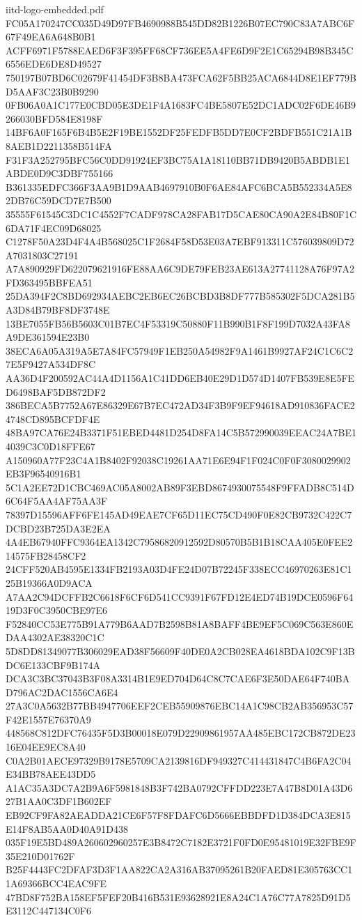 \begin{filecontents*}[overwrite]{iitd-logo-embedded.pdf}
FC05A170247CC035D49D97FB4690988B545DD82B1226B07EC790C83A7ABC6F67F49EA6A648B0B1
ACFF6971F5788EAED6F3F395FF68CF736EE5A4FE6D9F2E1C65294B98B345C6556EDE6DE8D49527
750197B07BD6C02679F41454DF3B8BA473FCA62F5BB25ACA6844D8E1EF779BD5AAF3C23B0B9290
0FB06A0A1C177E0CBD05E3DE1F4A1683FC4BE5807E52DC1ADC02F6DE46B9266030BFD584E8198F
14BF6A0F165F6B4B5E2F19BE1552DF25FEDFB5DD7E0CF2BDFB551C21A1B8AEB1D2211358B514FA
F31F3A252795BFC56C0DD91924EF3BC75A1A18110BB71DB9420B5ABDB1E1ABDE0D9C3DBF755166
B361335EDFC366F3AA9B1D9AAB4697910B0F6AE84AFC6BCA5B552334A5E82DB76C59DCD7E7B500
35555F61545C3DC1C4552F7CADF978CA28FAB17D5CAE80CA90A2E84B80F1C6DA71F4EC09D68025
C1278F50A23D4F4A4B568025C1F2684F58D53E03A7EBF913311C576039809D72A7031803C27191
A7A890929FD622079621916FE88AA6C9DE79FEB23AE613A27741128A76F97A2FD363495BBFEA51
25DA394F2C8BD692934AEBC2EB6EC26BCBD3B8DF777B585302F5DCA281B5A3D84B79BF8DF3748E
13BE7055FB56B5603C01B7EC4F53319C50880F11B990B1F8F199D7032A43FA8A9DE361594E23B0
38ECA6A05A319A5E7A84FC57949F1EB250A54982F9A1461B9927AF24C1C6C27E5F9427A534DF8C
AA36D4F200592AC44A4D1156A1C41DD6EB40E29D1D574D1407FB539E8E5FED6498BAF5DB872DF2
386BECA5B7752A67E86329E67B7EC472AD34F3B9F9EF94618AD910836FACE24748CD895BCFDF4E
48BA97CA76E24B3371F51EBED4481D254D8FA14C5B572990039EEAC24A7BE14039C3C0D18FFE67
A150960A77F23C4A1B8402F92038C19261AA71E6E94F1F024C0F0F3080029902EB3F96540916B1
5C1A2EE72D1CBC469AC05A8002AB89F3EBD8674930075548F9FFADB8C514D6C64F5AA4AF75AA3F
78397D15596AFF6FE145AD49EAE7CF65D11EC75CD490F0E82CB9732C422C7DCBD23B725DA3E2EA
4A4EB67940FFC9364EA1342C79586820912592D80570B5B1B18CAA405E0FEE214575FB28458CF2
24CFF520AB4595E1334FB2193A03D4FE24D07B72245F338ECC46970263E81C125B19366A0D9ACA
A7AA2C94DCFFB2C6618F6CF6D541CC9391F67FD12E4ED74B19DCE0596F6419D3F0C3950CBE97E6
F52840CC53E775B91A779B6AAD7B2598B81A8BAFF4BE9EF5C069C563E860EDAA4302AE38320C1C
5D8DD81349077B306029EAD38F56609F40DE0A2CB028EA4618BDA102C9F13BDC6E133CBF9B174A
DCA3C3BC37043B3F08A3314B1E9ED704D64C8C7CAE6F3E50DAE64F740BAD796AC2DAC1556CA6E4
27A3C0A5632B77BB4947706EEF2CEB55909876EBC14A1C98CB2AB356953C57F42E1557E76370A9
448568C812DFC76435F5D3B00018E079D22909861957AA485EBC172CB872DE2316E04EE9EC8A40
C0A2B01AECE97329B9178E5709CA2139816DF949327C414431847C4B6FA2C04E34BB78AEE43DD5
A1AC35A3DC7A2B9A6F5981848B3F742BA0792CFFDD223E7A47B8D01A43D627B1AA0C3DF1B602EF
EB92CF9FA82AEADDA21CE6F57F8FDAFC6D5666EBBDFD1D384DCA3E815E14F8AB5AA0D40A91D438
035F19E5BD489A260602960257E3B8472C7182E3721F0FD0E95481019E32FBE9F35E210D01762F
B25F4443FC2DFAF3D3F1AA822CA2A316AB37095261B20FAED81E305763CC11A69366BCC4EAC9FE
47BD8F752BA158EF5FEF20B416B531E93628921E8A24C1A76C77A7825D91D5E3112C447134C0F6

\end{filecontents*}
